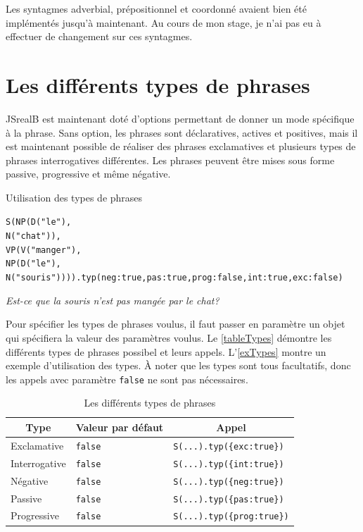 \documentclass[11pt]{article} %
\newcommand{\system}[1]{\textsf{#1}}
\newcommand{\JSB}{\system{JSrealB}}
\newcommand{\real}[1]{\emph{#1}}
\begin{document}
Les syntagmes adverbial, prépositionnel et coordonné avaient bien
été implémentés jusqu'à maintenant. Au cours de mon stage, je n'ai
pas eu à effectuer de changement sur ces syntagmes.

\section{Les différents types de phrases}
\label{typePhrases}
\JSB{} est maintenant doté d'options permettant de donner un mode
spécifique à la phrase. Sans option, les phrases sont déclaratives, actives et positives,
mais il est maintenant possible de réaliser des phrases exclamatives
et plusieurs types de phrases interrogatives différentes. Les phrases 
peuvent être mises sous forme passive, progressive et même négative.

\begin{example}
\caption{Utilisation des types de phrases}
\begin{alltt}
S(NP(D("le"),
     N("chat")),
  VP(V("manger"),
     NP(D("le"),
        N("souris")))).typ({neg:true,pas:true,prog:false,int:true,exc:false})
\end{alltt} 
\real{Est-ce que la souris n'est pas mangée par le chat?}
\label{exTypes}
\end{example}

Pour spécifier les types de phrases voulus, il faut passer en paramètre
un objet qui spécifiera la valeur des paramètres voulus. Le \autoref{tableTypes} démontre
les différents types de phrases possibel et leurs appels. L'\autoref{exTypes} montre un exemple
d'utilisation des types. À noter que les types sont tous facultatifs, donc les appels avec paramètre
\texttt{false} ne sont pas nécessaires.

\begin{table}[ht]
\centering
\caption{Les différents types de phrases}
\begin{tabular}{|l|l|l|}
\hline
\multicolumn{1}{|c}{Type} & \multicolumn{1}{|c}{Valeur par défaut} & \multicolumn{1}{|c|}{Appel}\\
\hline
Exclamative & \texttt{false} & \texttt{S(...).typ(\{exc:true\})} \\
\hline
Interrogative & \texttt{false} & \texttt{S(...).typ(\{int:true\})} \\
\hline
Négative & \texttt{false} & \texttt{S(...).typ(\{neg:true\})} \\
\hline
Passive & \texttt{false} & \texttt{S(...).typ(\{pas:true\})} \\
\hline
Progressive & \texttt{false} & \texttt{S(...).typ(\{prog:true\})} \\
\hline
\end{tabular}
\label{tableTypes}
\end{table}
\end{document}
